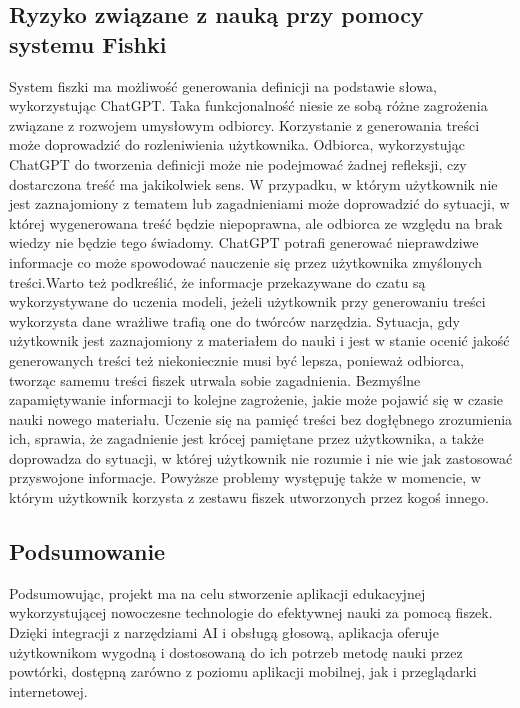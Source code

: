 \subsection{Ryzyko związane z nauką przy pomocy systemu Fishki}
System fiszki ma możliwość generowania definicji na podstawie słowa, wykorzystując ChatGPT. Taka funkcjonalność niesie ze sobą różne zagrożenia związane z rozwojem umysłowym odbiorcy. Korzystanie z generowania treści może doprowadzić do rozleniwienia użytkownika. Odbiorca, wykorzystując ChatGPT do tworzenia definicji może nie podejmować żadnej refleksji, czy dostarczona treść ma jakikolwiek sens. W przypadku, w którym użytkownik nie jest zaznajomiony z tematem lub zagadnieniami może doprowadzić do sytuacji, w której wygenerowana treść będzie niepoprawna, ale odbiorca ze względu na brak wiedzy nie będzie tego świadomy. ChatGPT potrafi generować nieprawdziwe informacje co może spowodować nauczenie się przez użytkownika zmyślonych treści.Warto też podkreślić, że informacje przekazywane do czatu są wykorzystywane do uczenia modeli, jeżeli użytkownik przy generowaniu treści wykorzysta dane wrażliwe trafią one do twórców narzędzia.\cite{chatGptRisk} Sytuacja, gdy użytkownik jest zaznajomiony z materiałem do nauki i jest w stanie ocenić jakość generowanych treści też niekoniecznie musi być lepsza, ponieważ odbiorca, tworząc samemu treści fiszek utrwala sobie zagadnienia. Bezmyślne zapamiętywanie informacji to kolejne zagrożenie, jakie może pojawić się w czasie nauki nowego materiału. Uczenie się na pamięć treści bez dogłębnego zrozumienia ich, sprawia, że zagadnienie jest krócej pamiętane przez użytkownika, a także doprowadza do sytuacji, w której użytkownik nie rozumie i nie wie jak zastosować przyswojone informacje. Powyższe problemy występuję także w momencie, w którym użytkownik korzysta z zestawu fiszek utworzonych przez kogoś innego.

\subsection{Podsumowanie}
Podsumowując, projekt ma na celu stworzenie aplikacji edukacyjnej wykorzystującej nowoczesne technologie do efektywnej nauki za pomocą fiszek. Dzięki integracji z narzędziami AI i obsługą głosową, aplikacja oferuje użytkownikom wygodną i dostosowaną do ich potrzeb metodę nauki przez powtórki, dostępną zarówno z poziomu aplikacji mobilnej, jak i przeglądarki internetowej.
